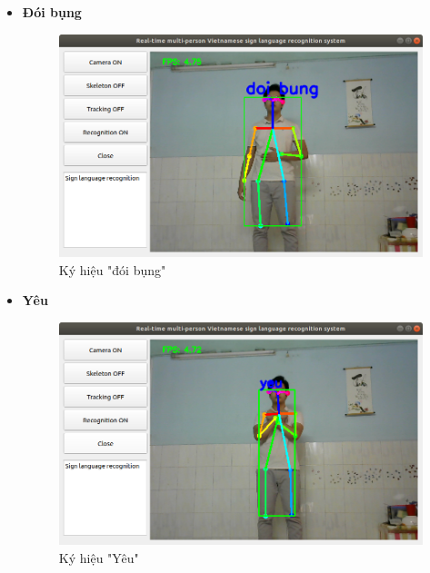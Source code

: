 \documentclass[12pt,a4paper,oneside]{book}
\numberwithin{equation}{chapter} %
\numberwithin{figure}{chapter} %
\numberwithin{table}{chapter} %
\begin{document}
\begin{itemize}
\item \textbf{Đói bụng}
\FloatBarrier
\begin{figure}[htp]
\begin{center}
\includegraphics[scale=0.4]{kq/doi_bung.png}
\end{center}
\caption{Ký hiệu "đói bụng"}
\end{figure}
\FloatBarrier

\thispagestyle{phuluc}
\pagebreak
\item \textbf{Yêu}
\FloatBarrier
\begin{figure}[htp]
\begin{center}
\includegraphics[scale=0.4]{kq/yeu.png}
\end{center}
\caption{Ký hiệu "Yêu"}
\end{figure}
\FloatBarrier


\end{itemize}
\end{document}
